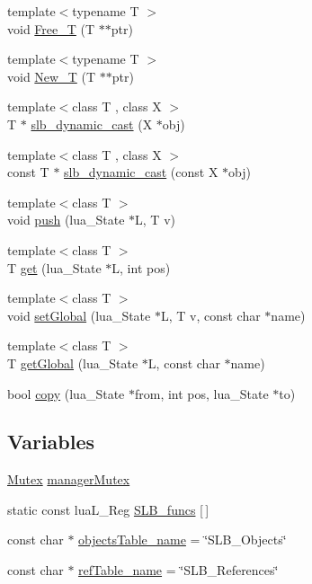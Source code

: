 \begin{DoxyCompactItemize}
\item 
{\footnotesize template$<$typename T $>$ }\\void \hyperlink{namespaceSLB_a4a7c2ff878419c5f24e3a3b22b3f288d}{Free\+\_\+T} (T $\ast$$\ast$ptr)
\item 
{\footnotesize template$<$typename T $>$ }\\void \hyperlink{namespaceSLB_a5748ebaee2b17dba11b8e1a90fb549f6}{New\+\_\+T} (T $\ast$$\ast$ptr)
\item 
{\footnotesize template$<$class T , class X $>$ }\\T $\ast$ \hyperlink{namespaceSLB_a86763cb6160e68f490772d52af522c7b}{slb\+\_\+dynamic\+\_\+cast} (X $\ast$obj)
\item 
{\footnotesize template$<$class T , class X $>$ }\\const T $\ast$ \hyperlink{namespaceSLB_a12bdad2bd731d538920440d2ea8d4970}{slb\+\_\+dynamic\+\_\+cast} (const X $\ast$obj)
\item 
{\footnotesize template$<$class T $>$ }\\void \hyperlink{namespaceSLB_af666c0f289621450a22c7478e8bee4c9}{push} (lua\+\_\+\+State $\ast$L, T v)
\item 
{\footnotesize template$<$class T $>$ }\\T \hyperlink{namespaceSLB_a40ec49ea0b5289f0e7b2a8db95280d94}{get} (lua\+\_\+\+State $\ast$L, int pos)
\item 
{\footnotesize template$<$class T $>$ }\\void \hyperlink{namespaceSLB_a5afea2301ba6ff42293996f279603f7a}{set\+Global} (lua\+\_\+\+State $\ast$L, T v, const char $\ast$name)
\item 
{\footnotesize template$<$class T $>$ }\\T \hyperlink{namespaceSLB_a10cbffba3574cd22bbfed0d7e3e4a55b}{get\+Global} (lua\+\_\+\+State $\ast$L, const char $\ast$name)
\item 
bool \hyperlink{namespaceSLB_affef197e89af562266bdc8b9e0dd54d6}{copy} (lua\+\_\+\+State $\ast$from, int pos, lua\+\_\+\+State $\ast$to)
\end{DoxyCompactItemize}
\subsection*{Variables}
\begin{DoxyCompactItemize}
\item 
\hyperlink{structSLB_1_1Mutex}{Mutex} \hyperlink{namespaceSLB_a55c5c9ee31bece3a7a46f0a0bb07ce4e}{manager\+Mutex}
\item 
static const lua\+L\+\_\+\+Reg \hyperlink{namespaceSLB_a24890659ebf4f33957ac8063262c08f5}{S\+L\+B\+\_\+funcs} \mbox{[}$\,$\mbox{]}
\item 
const char $\ast$ \hyperlink{namespaceSLB_ae45ca5473089acb030141c1d089fbfaf}{objects\+Table\+\_\+name} = \char`\"{}S\+L\+B\+\_\+\+Objects\char`\"{}
\item 
const char $\ast$ \hyperlink{namespaceSLB_ac54699c98c017e6330ffbee3bff3f99a}{ref\+Table\+\_\+name} = \char`\"{}S\+L\+B\+\_\+\+References\char`\"{}
\end{DoxyCompactItemize}


